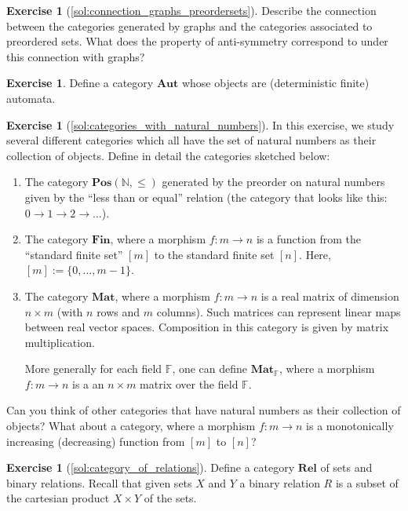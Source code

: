 \documentclass[a4paper,11pt, oneside,titlepage=false]{scrbook}
\theoremstyle{plain}
\theoremstyle{definition}
\newtheorem{exer}[thm]{Exercise}
\newcommand{\Catb}[1]{\mathbf{#1}}
\newcommand{\POS}{\Catb{Pos}}
\newcommand{\MAT}{\Catb{Mat}}
\newcommand{\SKELFINSET}{\Catb{Fin}}
\newcommand{\REL}{\Catb{Rel}}
\newcommand{\NN}{\ensuremath{\mathbb{N}}}
\begin{document}
\begin{exer}[\cref{sol:connection_graphs_preordersets}] \label{exer:connection_graphs_preordersets}
Describe the connection between the categories generated by graphs and the categories associated to preordered sets. What does the property of anti-symmetry correspond to under this connection with graphs?
\end{exer}

\begin{exer} Define a category $\Catb{Aut}$ whose objects are (deterministic finite) automata. 
\end{exer}

\begin{exer}[\cref{sol:categories_with_natural_numbers}] \label{exer:categories_with_natural_numbers}
  In this exercise, we study several different categories which all have the set of natural numbers as their collection of objects.
  Define in detail the categories sketched below:
  \begin{enumerate}
  \item The category $\POS(\NN, \leq)$ generated by the preorder on natural numbers given by the ``less than or equal'' relation (the category that looks like this: $0 \to 1 \to 2 \to \ldots$).
  \item The category $\SKELFINSET$, where a morphism $f : m \to n$ is a function from the ``standard finite set'' $[m]$ to the standard finite set $[n]$. Here, $[m] := \{0,\ldots,m-1\}$.
  \item The category $\MAT$, where a morphism $f : m \to n$ is a real matrix of dimension $n \times m$ (with $n$ rows and $m$ columns).
    Such matrices can represent linear maps between real vector spaces.
    Composition in this category is given by matrix multiplication.

    More generally for each field $\mathbb{F}$, one can define $\MAT_\mathbb{F}$, where a morphism $f : m \to n$ is a an $n \times m$ matrix over the field $\mathbb{F}$.
  \end{enumerate}

  Can you think of other categories that have natural numbers as their collection of objects? What about a category, where a morphism $f : m \to n$ is a monotonically increasing (decreasing) function from $[m]$ to $[n]$?
\end{exer}

\begin{exer}[\cref{sol:category_of_relations}] \label{exer:category_of_relations}
  Define a category $\REL$ of sets and binary relations. Recall that given sets $X$ and $Y$ a binary relation $R$ is a subset of the cartesian product $X \times Y$ of the sets.
\end{exer}
\end{document}

